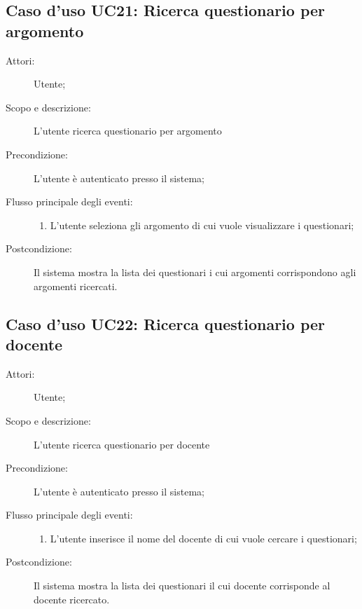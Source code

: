 \subsection{Caso d'uso UC21: Ricerca questionario per argomento}\begin{description}
\item[Attori:] Utente;
\item[Scopo e descrizione:] L'utente ricerca questionario per argomento
      \item[Precondizione:] L'utente è autenticato presso il sistema;

        \item[Flusso principale degli eventi:] \begin{enumerate}
          \item L'utente seleziona gli argomento di cui vuole visualizzare i questionari;

      \end{enumerate}
    \item[Postcondizione:] Il sistema mostra la lista dei questionari i cui argomenti corrispondono agli argomenti ricercati.
  \end{description}
\hypertarget{UC22}{}
\subsection{Caso d'uso UC22: Ricerca questionario per docente}\begin{description}
\item[Attori:] Utente;
\item[Scopo e descrizione:] L'utente ricerca questionario per docente
      \item[Precondizione:] L'utente è autenticato presso il sistema;

        \item[Flusso principale degli eventi:] \begin{enumerate}
          \item L'utente inserisce il nome del docente di cui vuole cercare i questionari;

      \end{enumerate}
    \item[Postcondizione:] Il sistema mostra la lista dei questionari il cui docente corrisponde al docente ricercato.
  \end{description}
\hypertarget{UC23}{}
